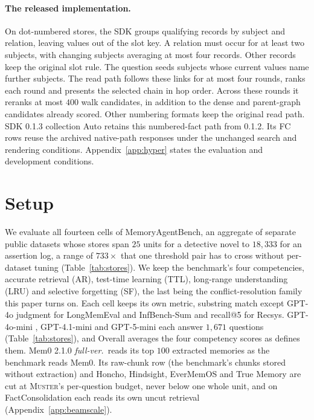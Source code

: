 \documentclass{article}
\newcommand{\sys}{\textsc{Muster}}
\begin{document}
\paragraph{The released implementation.} On dot-numbered stores, the SDK groups qualifying records by subject and relation, leaving values out of the slot key. A relation must occur for at least two subjects, with changing subjects averaging at most four records. Other records keep the original slot rule. The question seeds subjects whose current values name further subjects. The read path follows these links for at most four rounds, ranks each round and presents the selected chain in hop order. Across these rounds it reranks at most $400$ walk candidates, in addition to the dense and parent-graph candidates already scored. Other numbering formats keep the original read path. SDK 0.1.3 collection Auto retains this numbered-fact path from 0.1.2. Its FC rows reuse the archived native-path responses under the unchanged search and rendering conditions. Appendix~\ref{app:hyper} states the evaluation and development conditions.

\section{Setup}\label{sec:setup}

We evaluate all fourteen cells of MemoryAgentBench, an aggregate of separate public datasets whose stores span $25$ units for a detective novel to $18{,}333$ for an assertion log, a range of $733\times$ that one threshold pair has to cross without per-dataset tuning (Table~\ref{tab:stores}). We keep the benchmark's four competencies, accurate retrieval (AR), test-time learning (TTL), long-range understanding (LRU) and selective forgetting (SF), the last being the conflict-resolution family this paper turns on. Each cell keeps its own metric, substring match except GPT-4o judgment for LongMemEval and InfBench-Sum and recall@5 for Recsys. GPT-4o-mini \cite{gpt4omini}, GPT-4.1-mini \cite{gpt41} and GPT-5-mini \cite{gpt5} each answer $1{,}671$ questions (Table~\ref{tab:stores}), and Overall averages the four competency scores as \cite{mab} defines them. Mem0 2.1.0 \emph{full-ver.}\ reads its top $100$ extracted memories as the benchmark reads Mem0. Its raw-chunk row (the benchmark's chunks stored without extraction) and Honcho, Hindsight, EverMemOS and True Memory are cut at \sys{}'s per-question budget, never below one whole unit, and on FactConsolidation each reads its own uncut retrieval (Appendix~\ref{app:beamscale}).
\end{document}

